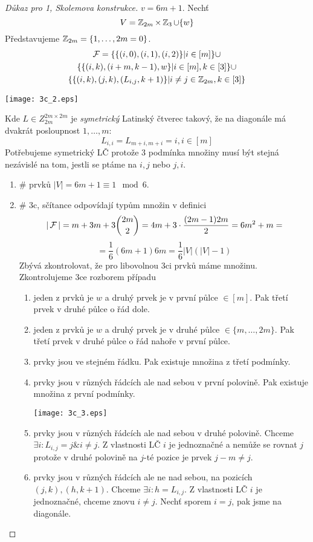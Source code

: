 \begin{proof}[Důkaz pro 1, Skolemova konstrukce]
	$v = 6m + 1$.
	Nechť
	\[ V = \operatorname{\mathbb{Z}}_{2m} \times \operatorname{\mathbb{Z}}_3 \cup \{w\} \]
	Představujeme $\operatorname{\mathbb{Z}}_{2m} = \{ 1, \ldots, 2m = 0 \}$.
	\begin{gather*}
		\operatorname{\mathcal{F}} = \{ \{ (i, 0), (i, 1), (i, 2) \}| i \in [m] \} \cup \\
		     \{ \{ (i, k), (i + m, k - 1), w \} | i \in [m], k \in [3] \} \cup \\
		     \{ \{ (i, k), (j, k), (L_{i, j}, k + 1) \} | i \ne j \in \operatorname{\mathbb{Z}}_{2m}, k \in [3] \}
	\end{gather*}

	\texttt{[image: 3c\_2.eps]}

	Kde $L \in Z_{2m}^{2m \times 2m}$ je \emph{symetrický} Latinský čtverec takový, že na diagonále má dvakrát posloupnost $1, \ldots, m$:
	\[ L_{i, i} = L_{m + i, m + i} = i, i \in [m] \]
	Potřebujeme symetrický LČ protože 3 podmínka množiny musí být stejná nezávislé na tom, jestli se ptáme na $i, j$ nebo $j, i$.

	\begin{enumerate}
		\item \# prvků $|V| = 6m + 1 \equiv 1 \mod 6$.
		\item \# 3c, sčítance odpovídají typům množin v definici
			\[ |\operatorname{\mathcal{F}}| = m + 3m + 3 \binom{2m}{2} = 4m + 3 \cdot \frac{(2m - 1)2m}{2} = 6m^2 + m = \]
			\[ = \frac{1}{6} (6m + 1) 6m = \frac{1}{6} |V|(|V| - 1) \]
			Zbývá zkontrolovat, že pro libovolnou 3ci prvků máme množinu.
			Zkontrolujeme 3ce rozborem případu
			\begin{enumerate}
				\item jeden z prvků je $w$ a druhý prvek je v první půlce $\in [m]$.
					Pak třetí prvek v druhé půlce o řád dole.
				\item jeden z prvků je $w$ a druhý prvek je v druhé půlce $\in \{ m, \ldots, 2m \}$.
					Pak třetí prvek v druhé půlce o řád nahoře v první půlce.
				\item prvky jsou ve stejném řádku.
					Pak existuje množina z třetí podmínky.
				\item prvky jsou v různých řádcích ale nad sebou v první polovině.
					Pak existuje množina z první podmínky.

				\texttt{[image: 3c\_3.eps]}
				\item prvky jsou v různých řádcích ale nad sebou v druhé polovině.
					Chceme $\exists i: L_{i, j} = j \& i \ne j$.
					Z vlastnosti LČ $i$ je jednoznačné a nemůže se rovnat $j$ protože v druhé polovině na $j$-té pozice je prvek $j - m \ne j$.
				\item prvky jsou v různých řádcích ale ne nad sebou, na pozicích $(j, k), (h, k + 1)$.
					Chceme $\exists i: h = L_{i, j}$.
					Z vlastnosti LČ $i$ je jednoznačné, chceme znovu $i \ne j$.
					Nechť sporem $i = j$, pak jsme na diagonále.


\end{enumerate}
\end{enumerate}
\end{proof}
